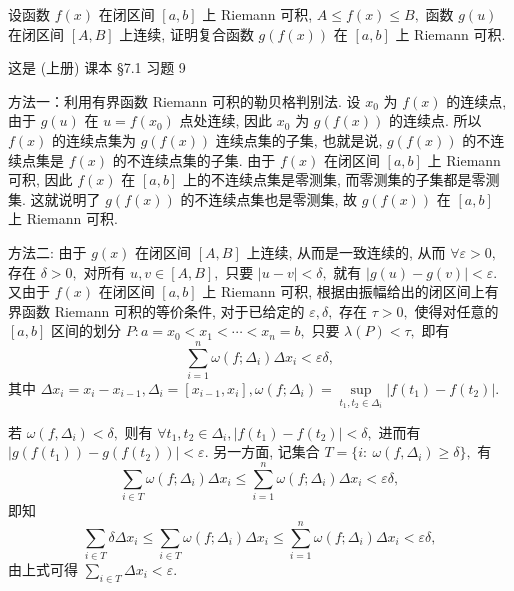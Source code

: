 \begin{question}[points = 8]
  设函数 $f(x)$ 在闭区间 $[a, b]$ 上 Riemann 可积, $A \leqslant f(x) \leqslant B,$ 函数 $g(u)$ 在闭区间 $[A, B]$ 上连续, 证明复合函数 $g(f(x))$ 在 $[a, b]$ 上 Riemann 可积.

\end{question}

\begin{solution}
  这是 (上册) 课本 \S 7.1 习题 9

  方法一：利用有界函数 Riemann 可积的勒贝格判别法. 设 $x_0$ 为 $f(x)$ 的连续点, 由于 $g(u)$ 在 $u=f(x_0)$ 点处连续, 因此 $x_0$ 为 $g(f(x))$ 的连续点. 所以 $f(x)$ 的连续点集为 $g(f(x))$ 连续点集的子集, 也就是说, $g(f(x))$ 的不连续点集是 $f(x)$ 的不连续点集的子集. 由于 $f(x)$ 在闭区间 $[a, b]$ 上 Riemann 可积, 因此 $f(x)$ 在 $[a, b]$ 上的不连续点集是零测集, 而零测集的子集都是零测集. 这就说明了 $g(f(x))$ 的不连续点集也是零测集, 故 $g(f(x))$ 在 $[a, b]$ 上 Riemann 可积.

  方法二: 由于 $g(x)$ 在闭区间 $[A, B]$ 上连续, 从而是一致连续的, 从而 $\forall \varepsilon > 0,$ 存在 $\delta > 0,$ 对所有 $u, v \in [A, B],$ 只要 $\lvert u - v \rvert < \delta,$ 就有 $\lvert g(u) - g(v) \rvert < \varepsilon.$ 又由于 $f(x)$ 在闭区间 $[a, b]$ 上 Riemann 可积, 根据由振幅给出的闭区间上有界函数 Riemann 可积的等价条件, 对于已给定的 $\varepsilon, \delta,$ 存在 $\tau > 0,$ 使得对任意的 $[a, b]$ 区间的划分 $P: a = x_0 < x_1 < \cdots < x_n = b,$ 只要 $\lambda(P) < \tau,$ 即有
  $$\sum\limits_{i=1}^n \omega(f; \Delta_i) \Delta x_i < \varepsilon \delta,$$
  其中 $\Delta x_i = x_i - x_{i-1}, \Delta_i = [x_{i-1}, x_i], \omega(f; \Delta_i) = \sup\limits_{t_1, t_2 \in \Delta_i} \lvert f(t_1) - f(t_2) \rvert.$
  
  若 $\omega(f, \Delta_i) < \delta,$ 则有 $\forall t_1, t_2 \in \Delta_i, \lvert f(t_1) - f(t_2) \rvert < \delta,$ 进而有 $\lvert g(f(t_1)) - g(f(t_2)) \rvert < \varepsilon.$ 另一方面, 记集合 $T = \{ i: ~ \omega(f, \Delta_i) \geqslant \delta \},$ 有
  $$\sum\limits_{i \in T} \omega(f; \Delta_i) \Delta x_i \leqslant \sum\limits_{i=1}^n \omega(f; \Delta_i) \Delta x_i < \varepsilon \delta,$$
  即知
  $$\sum\limits_{i \in T} \delta \Delta x_i \leqslant \sum\limits_{i \in T} \omega(f; \Delta_i) \Delta x_i \leqslant \sum\limits_{i=1}^n \omega(f; \Delta_i) \Delta x_i < \varepsilon \delta,$$
  由上式可得 $\sum\limits_{i \in T} \Delta x_i < \varepsilon.$
  

\end{solution}
